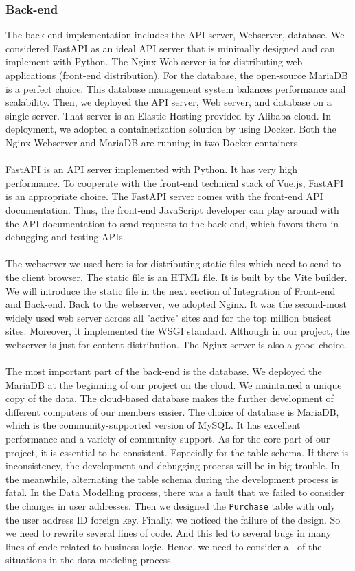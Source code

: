 \documentclass{article}
\begin{document}
\subsubsection{Back-end}

The back-end implementation includes the API server, Webserver, database. We considered FastAPI as an ideal API server that is minimally designed and can implement with Python. The Nginx Web server is for distributing web applications (front-end distribution). For the database, the open-source MariaDB is a perfect choice. This database management system balances performance and scalability. Then, we deployed the API server, Web server, and database on a single server. That server is an Elastic Hosting provided by Alibaba cloud. In deployment, we adopted a containerization solution by using Docker. Both the Nginx Webserver and MariaDB are running in two Docker containers.
\\\\
FastAPI is an API server implemented with Python. It has very high performance. To cooperate with the front-end technical stack of Vue.js, FastAPI is an appropriate choice. The FastAPI server comes with the front-end API documentation. Thus, the front-end JavaScript developer can play around with the API documentation to send requests to the back-end, which favors them in debugging and testing APIs.
\\\\
The webserver we used here is for distributing static files which need to send to the client browser. The static file is an HTML file. It is built by the Vite builder. We will introduce the static file in the next section of Integration of Front-end and Back-end. Back to the webserver, we adopted Nginx. It was the second-most widely used web server across all "active" sites and for the top million busiest sites. Moreover, it implemented the WSGI standard. Although in our project, the webserver is just for content distribution. The Nginx server is also a good choice.
\\\\
The most important part of the back-end is the database. We deployed the MariaDB at the beginning of our project on the cloud. We maintained a unique copy of the data. The cloud-based database makes the further development of different computers of our members easier. The choice of database is MariaDB, which is the community-supported version of MySQL. It has excellent performance and a variety of community support. As for the core part of our project, it is essential to be consistent. Especially for the table schema. If there is inconsistency, the development and debugging process will be in big trouble. In the meanwhile, alternating the table schema during the development process is fatal. In the Data Modelling process, there was a fault that we failed to consider the changes in user addresses. Then we designed the \verb|Purchase| table with only the user address ID foreign key. Finally, we noticed the failure of the design. So we need to rewrite several lines of code. And this led to several bugs in many lines of code related to business logic. Hence, we need to consider all of the situations in the data modeling process.
\end{document}
